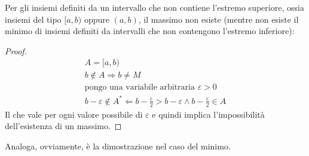 Per gli insiemi definiti da un intervallo che non contiene l'estremo superiore, ossia insiemi del tipo $[a,b)$ oppure $(a,b)$, il massimo non esiste (mentre non esiste il minimo di insiemi definiti da intervalli che non contengono l'estremo inferiore):
\begin{proof}
	\begin{gather*}
		A=[a,b)\\
		b\notin A\Rightarrow b\neq M\\
		\text{pongo una variabile arbitraria } \varepsilon>0\\
		b-\varepsilon\notin A^*\Leftarrow b-\frac{\varepsilon}{2}>b-\varepsilon\land b-\frac{\varepsilon}{2}\in A
	\end{gather*}
	Il che vale per ogni valore possibile di $\varepsilon$ e quindi implica l'impossibilità dell'esistenza di un massimo.
\end{proof}
Analoga, ovviamente, è la dimostrazione nel caso del minimo.
